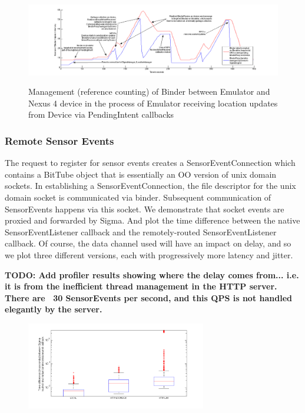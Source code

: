 \documentclass[prodmode]{acmlarge}
\begin{document}
\begin{figure}[h]
\centering
\includegraphics[width=1.2\textwidth]{plots/location_sharing_reference_counting.png}
\label{fig:reference_counting}
\caption{Management (reference counting) of Binder between Emulator and Nexus 4 device in the process of Emulator receiving location updates from Device via PendingIntent callbacks}
\end{figure}

\subsubsection{Remote Sensor Events}
The request to register for sensor events creates a SensorEventConnection which contains a BitTube object that is essentially an OO version of unix domain sockets. In establishing a SensorEventConnection, the file descriptor for the unix domain socket is communicated via binder. Subsequent communication of SensorEvents happens via this socket. We demonstrate that socket events are proxied and forwarded by Sigma. And plot the time difference between the native SensorEventListener callback and the remotely-routed SensorEventListener callback. Of course, the data channel used will have an impact on delay, and so we plot three different versions, each with progressively more latency and jitter.

\textbf{TODO: Add profiler results showing where the delay comes from... i.e. it is from the inefficient thread management in the HTTP server. There are ~30 SensorEvents per second, and this QPS is not handled elegantly by the server.}

\begin{figure}[h]
\centering
\includegraphics[width=0.7\textwidth]{plots/sensorevent_delay.png}
\end{figure}
\end{document}
